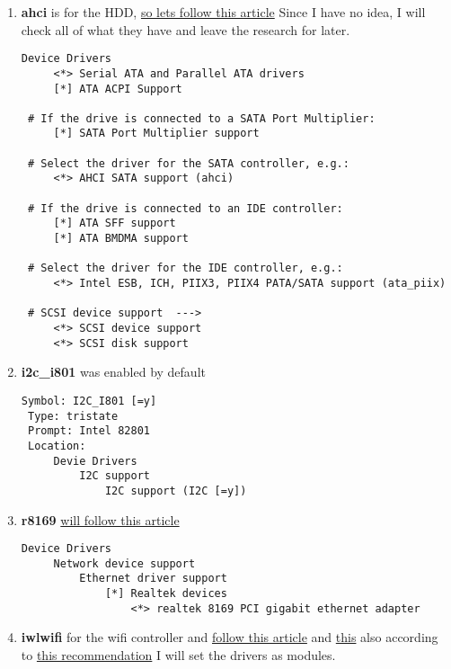 \documentclass[10pt,a4paper]{article}
\begin{document}
\begin{enumerate}
                   \newpage
                   \item \textbf{ahci} is for the HDD, \href{https://wiki.gentoo.org/wiki/HDD#Kernel}{so lets follow this article} Since I have no idea, I will check all of what they have and leave the research for later.
                   
                   \begin{lstlisting}[style=KernelConfig]
 Device Drivers
     <*> Serial ATA and Parallel ATA drivers
     [*] ATA ACPI Support
 
 # If the drive is connected to a SATA Port Multiplier:
     [*] SATA Port Multiplier support
 
 # Select the driver for the SATA controller, e.g.:
     <*> AHCI SATA support (ahci)
 
 # If the drive is connected to an IDE controller:
     [*] ATA SFF support
     [*] ATA BMDMA support
 
 # Select the driver for the IDE controller, e.g.:
     <*> Intel ESB, ICH, PIIX3, PIIX4 PATA/SATA support (ata_piix)
 
 # SCSI device support  ---> 
     <*> SCSI device support
     <*> SCSI disk support 
                   \end{lstlisting}
                   
                   \newpage
                   \item \textbf{i2c\_i801} was enabled by default
                   \begin{lstlisting}[style=KernelConfig]
 Symbol: I2C_I801 [=y]
 Type: tristate
 Prompt: Intel 82801
 Location:
     Devie Drivers
         I2C support
             I2C support (I2C [=y])
                   \end{lstlisting}

                    \newpage
                    \item \textbf{r8169} \href{https://wiki.gentoo.org/wiki/Ethernet#Kernel}{will follow this article}
                    
                    \begin{lstlisting}[style=KernelConfig]
 Device Drivers
     Network device support
         Ethernet driver support
             [*] Realtek devices
                 <*> realtek 8169 PCI gigabit ethernet adapter
                    \end{lstlisting}
                    
                    \newpage
                    \item \textbf{iwlwifi} for the wifi controller and  \href{https://wiki.gentoo.org/wiki/Iwlwifi#Kernel}{follow this article} and \href{https://wiki.gentoo.org/wiki/Wifi#Kernel}{this} also according to \href{https://forums.gentoo.org/viewtopic-p-7640140.html#7640140}{this recommendation} I will set the drivers as modules.
                    

\end{enumerate}
\end{document}
